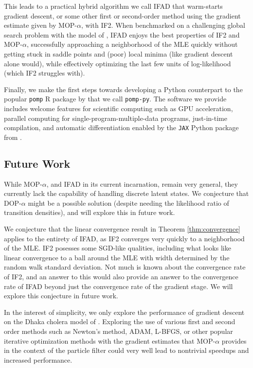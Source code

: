 \documentclass{article}
\begin{document}
This leads to a practical hybrid algorithm we call IFAD that warm-starts gradient descent, or some other first or second-order method using the gradient estimate given by MOP-$\alpha$, with IF2. When benchmarked on a challenging global search problem with the model of \cite{king08}, IFAD enjoys the best properties of IF2 and MOP-$\alpha$, successfully approaching a neighborhood of the MLE quickly without getting stuck in saddle points and (poor) local minima (like gradient descent alone would), while effectively optimizing the last few units of log-likelihood (which IF2 struggles with). 

Finally, we make the first steps towards developing a Python counterpart to the popular \texttt{pomp} R package by \citet{king16, king2017pompmanual} that we call \texttt{pomp-py}. The software we provide includes welcome features for scientific computing such as GPU acceleration, parallel computing for single-program-multiple-data programs, just-in-time compilation, and automatic differentiation enabled by the \texttt{JAX} Python package from \citet{jax2018github}. 


\subsection{Future Work}

While MOP-$\alpha$, and IFAD in its current incarnation, remain very general, they currently lack the capability of handling discrete latent states. We conjecture that DOP-$\alpha$ might be a possible solution (despite needing the likelihood ratio of transition densities), and will explore this in future work.

We conjecture that the linear convergence result in Theorem \ref{thm:convergence} applies to the entirety of IFAD, as IF2 converges very quickly to a neighborhood of the MLE. IF2 posesses some SGD-like qualities, including what looks like linear convergence to a ball around the MLE with width determined by the random walk standard deviation. Not much is known about the convergence rate of IF2, and an answer to this would also provide an answer to the convergence rate of IFAD beyond just the convergence rate of the gradient stage. We will explore this conjecture in future work.

In the interest of simplicity, we only explore the performance of gradient descent on the Dhaka cholera model of \cite{king08}. Exploring the use of various first and second order methods such as Newton's method, ADAM, L-BFGS, or other popular iterative optimization methods with the gradient estimates that MOP-$\alpha$ provides in the context of the particle filter could very well lead to nontrivial speedups and increased performance. 
\end{document}
